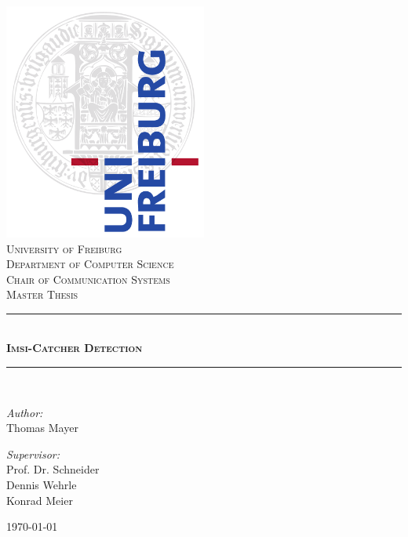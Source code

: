 
\begin{titlepage}
	\begin{center}
		\includegraphics[width=0.5\textwidth]{../Images/unisiegel}\\[1cm]

		\textsc{\LARGE University of Freiburg}\\[0.5cm]
		\textsc{Department of Computer Science\\Chair of Communication Systems}\\[2cm]
		\textsc{\LARGE Master Thesis}\\[0.5cm]

		\rule{\linewidth}{0.5mm} \\[0.7cm]
		\textsc{\huge \bfseries Imsi-Catcher Detection}\\[0.4cm]
		\rule{\linewidth}{0.5mm} \\[1.5cm]

		\begin{minipage}{0.4\textwidth}
			\begin{flushleft} \large
				\emph{Author:}\\
				Thomas Mayer
			\end{flushleft}
		\end{minipage}
		\begin{minipage}{0.4\textwidth}
			\begin{flushright} \large
				\emph{Supervisor:} \\
				Prof. Dr. Schneider\\
				Dennis Wehrle\\
				Konrad Meier
			\end{flushright}
		\end{minipage}

		\vfill
		{\large \today}
	\end{center}
\end{titlepage}